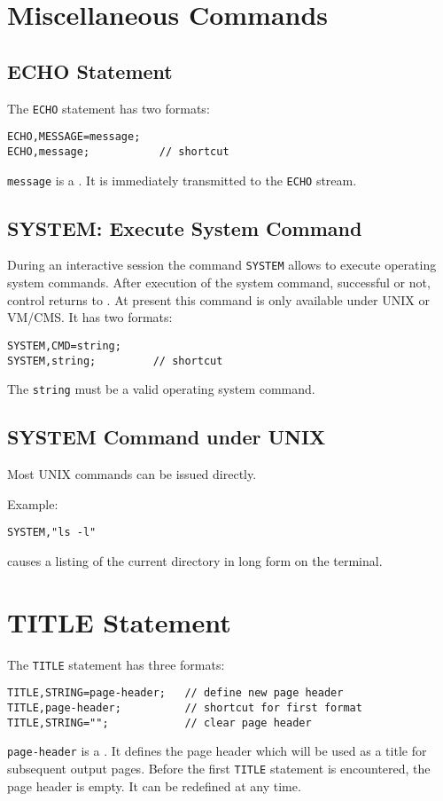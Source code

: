 \section{Miscellaneous Commands}

\subsection{ECHO Statement}
\label{sec:echo}
The \texttt{ECHO} statement has two formats:
\begin{verbatim}
ECHO,MESSAGE=message;
ECHO,message;           // shortcut
\end{verbatim}
\texttt{message} is a .
It is immediately transmitted to the \texttt{ECHO} stream.

\subsection{SYSTEM: Execute System Command}
\label{sec:system}
During an interactive \opal session the command \texttt{SYSTEM}
allows to execute operating system commands.
After execution of the system command, successful or not,
control returns to \opal.
At present this command is only available under UNIX or VM/CMS.
It has two formats:
\begin{verbatim}
SYSTEM,CMD=string;
SYSTEM,string;         // shortcut
\end{verbatim}
The  \texttt{string} must be a valid operating
system command. 

\subsection{SYSTEM Command under UNIX}
Most UNIX commands can be issued directly.

\noindent Example:
\begin{verbatim}
SYSTEM,"ls -l"
\end{verbatim}
causes a listing of the current directory in long form on the terminal.

\section{TITLE Statement}
\label{sec:title}
The \texttt{TITLE} statement has three formats:
\begin{verbatim}
TITLE,STRING=page-header;   // define new page header
TITLE,page-header;          // shortcut for first format
TITLE,STRING="";            // clear page header
\end{verbatim}
\texttt{page-header} is a .
It defines the page header which will be used as a title for
subsequent output pages. 
Before the first \texttt{TITLE} statement is encountered, 
the page header is empty.
It can be redefined at any time.

